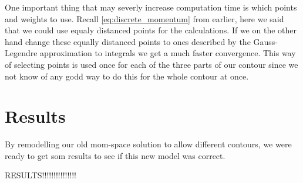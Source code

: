 One important thing that may severly increase computation time is which points and weights to use.
Recall \cref{eq:discrete_momentum} from earlier, here we said that we could use equaly distanced points for the calculations.
If we on the other hand change these equally distanced points to ones described by the Gauss-Legendre approximation to integrals we get a much faster convergence.
This way of selecting points is used once for each of the three parts of our contour since we not know of any godd way to do this for the whole contour at once.

\section{Results}
By remodelling our old mom-space solution to allow different contours, we were ready to get som results to see if this new model was correct.

{\Large RESULTS!!!!!!!!!!!!!!!}
